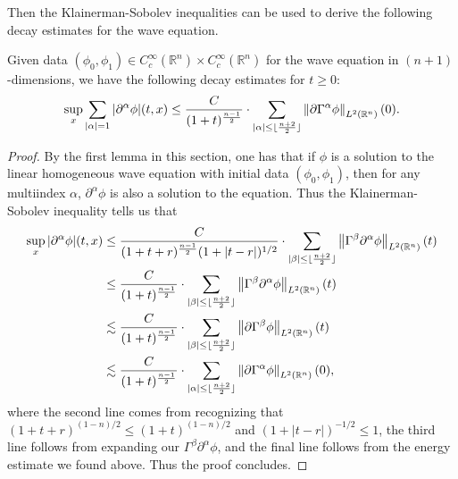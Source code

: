 \documentclass{article}
\begin{document}
Then the Klainerman-Sobolev inequalities can be used to derive the following decay estimates for the wave equation. 
\begin{corollary}
	Given data $(\phi_{0}, \phi_{1}) \in C_{c}^{\infty}(\mathbb{R}^{n}) \times C_{c}^{\infty}(\mathbb{R}^{n})$ for the wave equation in $(n + 1)$-dimensions, we have the following decay estimates for $t \geq 0$: 
	\begin{equation*}
		\sup_{x}\sum_{|\alpha| = 1}|\partial^{\alpha}\phi|(t, x) \leq \frac{C}{(1 + t)^{\frac{n-1}{2}}} \cdot \sum_{|\alpha| \leq \lfloor \frac{n + 2}{2}\rfloor}\left\Vert \partial \Gamma^{\alpha}\phi \right\Vert_{L^{2}(\mathbb{R}^{n})}(0). 
	\end{equation*} 
\end{corollary} 
\begin{proof}
	By the first lemma in this section, one has that if $\phi$ is a solution to the linear homogeneous wave equation with initial data $(\phi_{0}, \phi_{1})$, then for any multiindex $\alpha$, $\partial^{\alpha}\phi$ is also a solution to the equation. Thus the Klainerman-Sobolev inequality tells us that 
	\begin{align*}
		\begin{split} 
		\sup_{x}|\partial^{\alpha}\phi|(t, x) &\leq \frac{C}{(1 + t + r)^{\frac{n - 1}{2}}(1 + |t - r|)^{1/2}} \cdot \sum_{|\beta| \leq \lfloor \frac{n + 2}{2}\rfloor}\left\Vert \Gamma^{\beta}\partial^{\alpha}\phi \right\Vert_{L^{2}(\mathbb{R}^{n})}(t) \\
		&\leq \frac{C}{(1 + t)^{\frac{n - 1}{2}}} \cdot \sum_{|\beta|\leq \lfloor \frac{n + 2}{2}\rfloor}\left\Vert \Gamma^{\beta}\partial^{\alpha} \phi \right\Vert_{L^{2}(\mathbb{R}^{n})}(t) \\
		&\lesssim \frac{C}{(1 + t)^{\frac{n - 1}{2}}} \cdot \sum_{|\beta|\leq \lfloor \frac{n + 2}{2}\rfloor} \left\Vert \partial \Gamma^{\beta}\phi \right\Vert_{L^{2}(\mathbb{R}^{n})}(t)  \\
		&\lesssim \frac{C}{(1 + t)^{\frac{n-1}{2}}} \cdot \sum_{|\alpha| \leq \lfloor \frac{n + 2}{2} \rfloor}\left\Vert \partial \Gamma^{\alpha}\phi \right\Vert_{L^{2}(\mathbb{R}^{n})}(0), 
		\end{split} 
	\end{align*} 
	where the second line comes from recognizing that $(1 + t + r)^{(1 - n)/2} \leq (1 + t)^{(1 - n)/2}$ and $(1 + |t - r|)^{-1/2} \leq 1$, the third line follows from expanding our $\Gamma^{\beta}\partial^{\alpha}\phi$, and the final line follows from the energy estimate we found above. Thus the proof concludes. 
\end{proof} 
\end{document}
